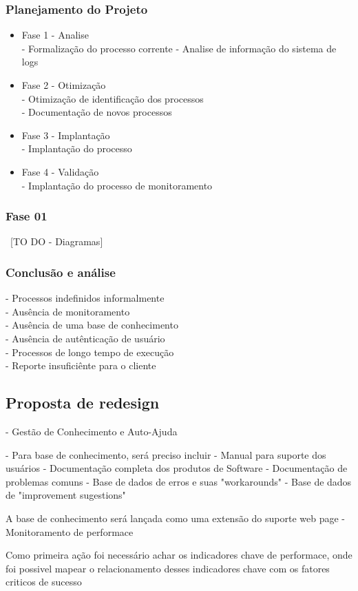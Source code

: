 \documentclass[11pt,a4paper]{article}
\begin{document}
\subsubsection{Planejamento do Projeto}
\begin{itemize}
\item Fase 1 - Analise \\
	- Formalização do processo corrente
	- Analise de informação do sistema de logs
\item Fase 2 - Otimização\\
	- Otimização de identificação dos processos\\
	- Documentação de novos processos
\item Fase 3 - Implantação \\
	- Implantação do processo\\
\item Fase 4 - Validação\\
	- Implantação do processo de monitoramento
\end{itemize}

\subsubsection{Fase 01}
~[TO DO - Diagramas]

\subsubsection{Conclusão e análise}
- Processos indefinidos informalmente\\
- Ausência de monitoramento\\
- Ausência de uma base de conhecimento\\
- Ausência de autênticação de usuário\\
- Processos de longo tempo de execução\\
- Reporte insuficiênte para o cliente\\

\subsection{Proposta de redesign}
- Gestão de Conhecimento e Auto-Ajuda

- Para base de conhecimento, será preciso incluir
	- Manual para suporte dos usuários
	- Documentação completa dos produtos de Software
	- Documentação de problemas comuns
	- Base de dados de erros e suas "workarounds"
	- Base de dados de "improvement sugestions"

A base de conhecimento será lançada como uma extensão do
suporte web page
- Monitoramento de performace

Como primeira ação foi necessário achar os indicadores chave de performace,
onde foi possivel mapear o relacionamento desses indicadores chave com os fatores
criticos de sucesso
\end{document}
